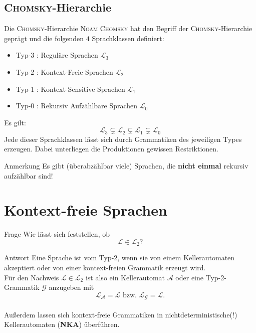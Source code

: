 \documentclass[]{beamer}
\begin{document}
\subsection{\textsc{Chomsky}-Hierarchie}
\begin{frame}[squeeze]{}
  \begin{block}{Die \textsc{Chomsky}-Hierarchie}
    \textsc{Noam Chomsky} hat den Begriff der \textsc{Chomsky}-Hierarchie geprägt und die folgenden $4$ Sprachklassen definiert:
    \begin{itemize}
      \item Typ-3 : Reguläre Sprachen $\mathcal{L}_3$
      \item Typ-2 : Kontext-Freie Sprachen $\mathcal{L}_2$
      \item Typ-1 : Kontext-Sensitive Sprachen $\mathcal{L}_1$
      \item Typ-0 : Rekursiv Aufzählbare Sprachen $\mathcal{L}_0$
    \end{itemize}
    \vspace*{0.5em}
    \pause
    Es gilt:
    \[\mathcal{L}_3 \subsetneq \mathcal{L}_2 \subsetneq \mathcal{L}_1 \subsetneq \mathcal{L}_0\]
    \pause
    Jede dieser Sprachklassen lässt sich durch Grammatiken des jeweiligen Types erzeugen. Dabei unterliegen die Produktionen gewissen Restriktionen.
  \end{block}
  
  \pause
  
  \begin{alertblock}{Anmerkung}
    Es gibt (überabzählbar viele) Sprachen, die \textbf{nicht einmal} rekursiv aufzählbar sind!
  \end{alertblock}
\end{frame}

\section{Kontext-freie Sprachen}
\begin{frame}[squeeze]{}
  \begin{alertblock}{Frage}
    Wie lässt sich feststellen, ob
      \[\mathcal{L} \in \mathcal{L}_2 \text{?}\]
  \end{alertblock}
  
  \pause
  
  \begin{exampleblock}{Antwort}
    Eine Sprache ist vom Typ-2, wenn sie von einem Kellerautomaten akzeptiert oder von einer kontext-freien Grammatik erzeugt wird. \\
    Für den Nachweis $\mathcal{L} \in \mathcal{L}_2$ ist also ein Kellerautomat $\mathcal{A}$ oder eine Typ-2-Grammatik $\mathcal{G}$ anzugeben mit
      \[\mathcal{L_A} = \mathcal{L} \text{ bzw. } \mathcal{L_G} = \mathcal{L}.\]
    \\
    \vspace*{0.5em}
    Außerdem lassen sich kontext-freie Grammatiken in nichtdeterministische(!) Kellerautomaten (\textbf{NKA}) überführen.
  \end{exampleblock}
\end{frame}
\end{document}
